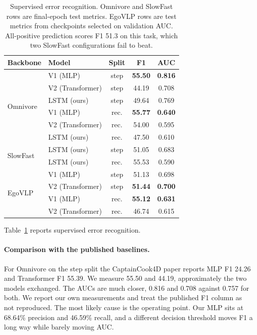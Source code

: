 \documentclass[10pt,twocolumn,letterpaper]{article}
\begin{document}
\begin{table}[t]
\centering\small
\setlength{\tabcolsep}{4pt}
\begin{tabular}{llccc}
\toprule
Backbone & Model & Split & F1 & AUC \\
\midrule
\multirow{6}{*}{Omnivore}
 & V1 (MLP)         & step & \textbf{55.50} & \textbf{0.816} \\
 & V2 (Transformer) & step & 44.19 & 0.708 \\
 & LSTM (ours)      & step & 49.64 & 0.769 \\
 & V1 (MLP)         & rec. & \textbf{55.77} & \textbf{0.640} \\
 & V2 (Transformer) & rec. & 54.00 & 0.595 \\
 & LSTM (ours)      & rec. & 47.50 & 0.610 \\
\midrule
\multirow{2}{*}{SlowFast}
 & LSTM (ours)      & step & 51.05 & 0.683 \\
 & LSTM (ours)      & rec. & 55.53 & 0.590 \\
\midrule
\multirow{4}{*}{EgoVLP}
 & V1 (MLP)         & step & 51.13 & 0.698 \\
 & V2 (Transformer) & step & \textbf{51.44} & \textbf{0.700} \\
 & V1 (MLP)         & rec. & \textbf{55.12} & \textbf{0.631} \\
 & V2 (Transformer) & rec. & 46.74 & 0.615 \\
\bottomrule
\end{tabular}
\caption{Supervised error recognition. Omnivore and SlowFast rows are final-epoch
test metrics. EgoVLP rows are test metrics from checkpoints selected on validation
AUC. All-positive prediction scores F1 51.3 on this task, which two SlowFast
configurations fail to beat.}
\label{tab:er}
\end{table}

Table~\ref{tab:er} reports supervised error recognition.

\paragraph{Comparison with the published baselines.} For Omnivore on the step
split the CaptainCook4D paper reports MLP F1 24.26 and Transformer F1 55.39. We
measure 55.50 and 44.19, approximately the two models exchanged. The AUCs are much
closer, 0.816 and 0.708 against 0.757 for both. We report our own measurements and
treat the published F1 column as not reproduced. The most likely cause is the
operating point. Our MLP sits at 68.64\% precision and 46.59\% recall, and a
different decision threshold moves F1 a long way while barely moving AUC.
\end{document}

